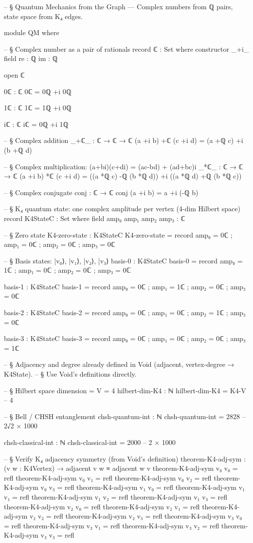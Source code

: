 \documentclass[11pt,a4paper]{book}
\begin{document}
\begin{code}
-- § Quantum Mechanics from the Graph — Complex numbers from ℚ pairs, state space from K₄ edges.

module QM where

  -- § Complex number as a pair of rationals
  record ℂ : Set where
    constructor _+i_
    field
      re : ℚ
      im : ℚ

  open ℂ

  0ℂ : ℂ
  0ℂ = 0ℚ +i 0ℚ

  1ℂ : ℂ
  1ℂ = 1ℚ +i 0ℚ

  iℂ : ℂ
  iℂ = 0ℚ +i 1ℚ

  -- § Complex addition
  _+ℂ_ : ℂ → ℂ → ℂ
  (a +i b) +ℂ (c +i d) = (a +ℚ c) +i (b +ℚ d)

  -- § Complex multiplication: (a+bi)(c+di) = (ac-bd) + (ad+bc)i
  _*ℂ_ : ℂ → ℂ → ℂ
  (a +i b) *ℂ (c +i d) = ((a *ℚ c) -ℚ (b *ℚ d)) +i ((a *ℚ d) +ℚ (b *ℚ c))

  -- § Complex conjugate
  conj : ℂ → ℂ
  conj (a +i b) = a +i (-ℚ b)

  -- § K₄ quantum state: one complex amplitude per vertex (4-dim Hilbert space)
  record K4StateC : Set where
    field
      amp₀ amp₁ amp₂ amp₃ : ℂ

  -- § Zero state
  K4-zero-state : K4StateC
  K4-zero-state = record { amp₀ = 0ℂ ; amp₁ = 0ℂ ; amp₂ = 0ℂ ; amp₃ = 0ℂ }

  -- § Basis states: |v₀⟩, |v₁⟩, |v₂⟩, |v₃⟩
  basis-0 : K4StateC
  basis-0 = record { amp₀ = 1ℂ ; amp₁ = 0ℂ ; amp₂ = 0ℂ ; amp₃ = 0ℂ }

  basis-1 : K4StateC
  basis-1 = record { amp₀ = 0ℂ ; amp₁ = 1ℂ ; amp₂ = 0ℂ ; amp₃ = 0ℂ }

  basis-2 : K4StateC
  basis-2 = record { amp₀ = 0ℂ ; amp₁ = 0ℂ ; amp₂ = 1ℂ ; amp₃ = 0ℂ }

  basis-3 : K4StateC
  basis-3 = record { amp₀ = 0ℂ ; amp₁ = 0ℂ ; amp₂ = 0ℂ ; amp₃ = 1ℂ }

-- § Adjacency and degree already defined in Void (adjacent, vertex-degree → K4State).
-- § Use Void's definitions directly.

-- § Hilbert space dimension = V = 4
hilbert-dim-K4 : ℕ
hilbert-dim-K4 = K4-V  -- 4

-- § Bell / CHSH entanglement
chsh-quantum-int : ℕ
chsh-quantum-int = 2828  -- 2√2 × 1000

chsh-classical-int : ℕ
chsh-classical-int = 2000  -- 2 × 1000

-- § Verify K₄ adjacency symmetry (from Void's definition)
theorem-K4-adj-sym : (v w : K4Vertex) → adjacent v w ≡ adjacent w v
theorem-K4-adj-sym v₀ v₀ = refl
theorem-K4-adj-sym v₀ v₁ = refl
theorem-K4-adj-sym v₀ v₂ = refl
theorem-K4-adj-sym v₀ v₃ = refl
theorem-K4-adj-sym v₁ v₀ = refl
theorem-K4-adj-sym v₁ v₁ = refl
theorem-K4-adj-sym v₁ v₂ = refl
theorem-K4-adj-sym v₁ v₃ = refl
theorem-K4-adj-sym v₂ v₀ = refl
theorem-K4-adj-sym v₂ v₁ = refl
theorem-K4-adj-sym v₂ v₂ = refl
theorem-K4-adj-sym v₂ v₃ = refl
theorem-K4-adj-sym v₃ v₀ = refl
theorem-K4-adj-sym v₃ v₁ = refl
theorem-K4-adj-sym v₃ v₂ = refl
theorem-K4-adj-sym v₃ v₃ = refl


\end{code}
\end{document}
